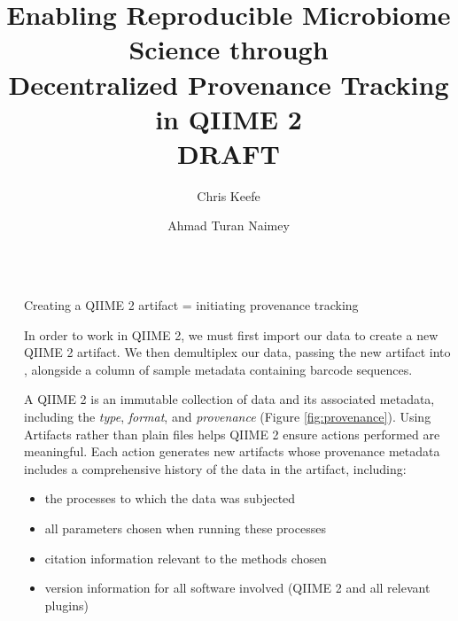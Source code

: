 \documentclass[final]{beamer}
\title{Enabling Reproducible Microbiome Science through \\ Decentralized Provenance Tracking in QIIME 2 \\ DRAFT}
\author{Chris Keefe \inst{1} \and Ahmad Turan Naimey \inst{1}}
\institute[shortinst]{\inst{1} Northern Arizona University; Pathogen and Microbiome Institute}
\newlength{\sepwidth}
\newlength{\colwidth}
\newcommand{\separatorcolumn}{\begin{column}{\sepwidth}\end{column}}
\begin{document}
\begin{frame}[t]
\begin{columns}[t]
\separatorcolumn

\begin{column}{\colwidth}


  \begin{block}{Creating a QIIME 2 artifact = initiating provenance tracking}

   In order to work in QIIME 2, we must first import our data to create a new
   QIIME 2 artifact. We then demultiplex our data, passing the new artifact
   into , alongside a column of sample metadata containing
   barcode sequences.

   \begin{tcolorbox}
   [width=\textwidth, colframe=blue]
   {A QIIME 2  is an immutable collection of data and its associated
           metadata, including the \textit{type}, \textit{format}, and \textit{provenance} (Figure \ref{fig:provenance}).
   Using Artifacts rather than plain files helps QIIME 2 ensure actions
   performed are meaningful. Each action generates new artifacts whose
   provenance metadata includes a comprehensive history of the data in the
   artifact, including:}
    \begin{itemize}
      \item {the processes to which the data was subjected}
      \item {all parameters chosen when running these processes}
      \item {citation information relevant to the methods chosen}
      \item {version information for all software involved (QIIME 2 and all relevant plugins)}
    \end{itemize}
    \end{tcolorbox}
  \end{block}


\end{column}
\end{columns}
\end{frame}
\end{document}
